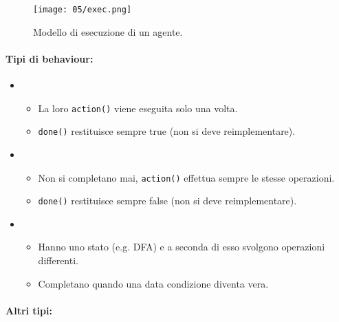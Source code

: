 
\begin{figure}[!h]
    \centering
    \texttt{[image: 05/exec.png]}
  \caption{Modello di esecuzione di un agente.}
\end{figure}

\paragraph{Tipi di behaviour:}

\begin{itemize}
  \item {}
    \begin{itemize}
      \item La loro \texttt{action()} viene eseguita solo una volta. 
      \item \texttt{done()} restituisce sempre true (non si deve reimplementare).
    \end{itemize}
  \item {}
    \begin{itemize}
      \item Non si completano mai, \texttt{action()} effettua sempre le stesse operazioni. 
      \item \texttt{done()} restituisce sempre false (non si deve reimplementare).
    \end{itemize}
  \item {}
    \begin{itemize}
      \item Hanno uno stato (e.g. DFA) e a seconda di esso svolgono operazioni differenti. 
      \item Completano quando una data condizione diventa vera.
    \end{itemize}
\end{itemize}

\paragraph{Altri tipi:}

